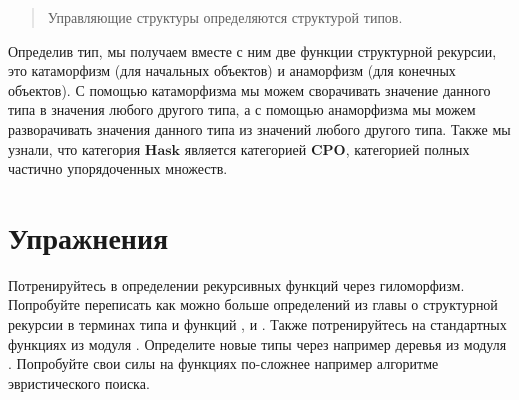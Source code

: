 \begin{quote}
Управляющие структуры определяются структурой типов.
\end{quote}

Определив тип, мы получаем вместе с ним две функции
структурной рекурсии, это катаморфизм (для начальных объектов) 
и анаморфизм (для конечных объектов). С помощью катаморфизма
мы можем сворачивать значение данного типа в значения
любого другого типа, а с помощью анаморфизма
мы можем разворачивать значения данного типа из
значений любого другого типа. Также мы узнали, что 
категория $\textbf{Hask}$
является категорией $\textbf{CPO}$, категорией полных
частично упорядоченных множеств.

\section{Упражнения}

Потренируйтесь в определении рекурсивных функций через гиломорфизм.
Попробуйте переписать как можно больше определений из главы
о структурной рекурсии в терминах типа  и функций 
,  и . Также потренируйтесь
на стандартных функциях из модуля . Определите
новые типы через  например деревья из модуля
. Попробуйте свои силы на функциях по-сложнее
например алгоритме эвристического поиска.

